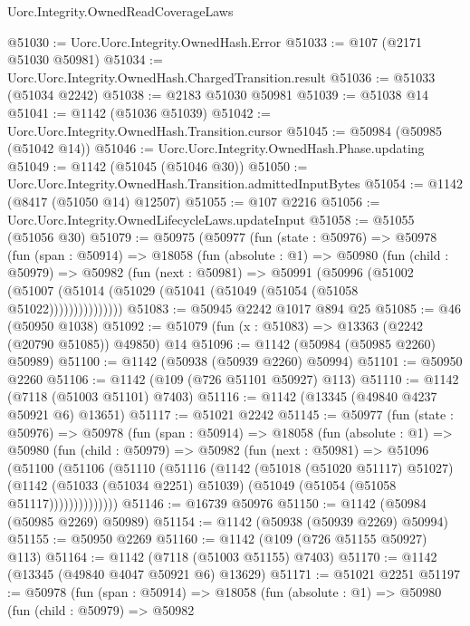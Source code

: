\begin{lexlean}{Uorc.Integrity.OwnedReadCoverageLaws}
\begin{coremodule}
@51030 := Uorc.Uorc.Integrity.OwnedHash.Error
@51033 := @107 (@2171 @51030 @50981)
@51034 := Uorc.Uorc.Integrity.OwnedHash.ChargedTransition.result
@51036 := @51033 (@51034 @2242)
@51038 := @2183 @51030 @50981
@51039 := @51038 @14
@51041 := @1142 (@51036 @51039)
@51042 := Uorc.Uorc.Integrity.OwnedHash.Transition.cursor
@51045 := @50984 (@50985 (@51042 @14))
@51046 := Uorc.Uorc.Integrity.OwnedHash.Phase.updating
@51049 := @1142 (@51045 (@51046 @30))
@51050 := Uorc.Uorc.Integrity.OwnedHash.Transition.admittedInputBytes
@51054 := @1142 (@8417 (@51050 @14) @12507)
@51055 := @107 @2216
@51056 := Uorc.Uorc.Integrity.OwnedLifecycleLaws.updateInput
@51058 := @51055 (@51056 @30)
@51079 := @50975
    (@50977
      (fun (state : @50976) =>
      @50978
        (fun (span : @50914) =>
        @18058
          (fun (absolute : @1) =>
          @50980
            (fun (child : @50979) =>
            @50982
              (fun (next : @50981) =>
              @50991
                (@50996
                  (@51002
                    (@51007 (@51014 (@51029 (@51041 (@51049 (@51054 (@51058 @51022)))))))))))))))
@51083 := @50945 @2242 @1017 @894 @25
@51085 := @46 (@50950 @1038)
@51092 := @51079 (fun (x : @51083) => @13363 (@2242 (@20790 @51085)) @49850) @14
@51096 := @1142 (@50984 (@50985 @2260) @50989)
@51100 := @1142 (@50938 (@50939 @2260) @50994)
@51101 := @50950 @2260
@51106 := @1142 (@109 (@726 @51101 @50927) @113)
@51110 := @1142 (@7118 (@51003 @51101) @7403)
@51116 := @1142 (@13345 (@49840 @4237 @50921 @6) @13651)
@51117 := @51021 @2242
@51145 := @50977
    (fun (state : @50976) =>
    @50978
      (fun (span : @50914) =>
      @18058
        (fun (absolute : @1) =>
        @50980
          (fun (child : @50979) =>
          @50982
            (fun (next : @50981) =>
            @51096
              (@51100
                (@51106
                  (@51110
                    (@51116
                      (@1142
                        (@51018 (@51020 @51117) @51027)
                        (@1142
                          (@51033 (@51034 @2251) @51039)
                          (@51049 (@51054 (@51058 @51117))))))))))))))
@51146 := @16739 @50976
@51150 := @1142 (@50984 (@50985 @2269) @50989)
@51154 := @1142 (@50938 (@50939 @2269) @50994)
@51155 := @50950 @2269
@51160 := @1142 (@109 (@726 @51155 @50927) @113)
@51164 := @1142 (@7118 (@51003 @51155) @7403)
@51170 := @1142 (@13345 (@49840 @4047 @50921 @6) @13629)
@51171 := @51021 @2251
@51197 := @50978
    (fun (span : @50914) =>
    @18058
      (fun (absolute : @1) =>
      @50980
        (fun (child : @50979) =>
        @50982

\end{coremodule}
\end{lexlean}
